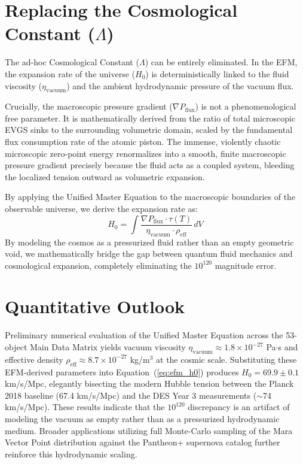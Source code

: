 \documentclass[11pt, a4paper, table]{article}
\begin{document}
\section{Replacing the Cosmological Constant (\texorpdfstring{$\Lambda$}{Lambda})}
  The ad-hoc Cosmological Constant ($\Lambda$) can be entirely eliminated. In the EFM, the expansion rate of the universe ($H_0$) is deterministically linked to the fluid viscosity ($\eta_{\text{vacuum}}$) and the ambient hydrodynamic pressure of the vacuum flux. 
  
  Crucially, the macroscopic pressure gradient ($\nabla P_{\text{flux}}$) is not a phenomenological free parameter. It is mathematically derived from the ratio of total microscopic EVGS sinks to the surrounding volumetric domain, scaled by the fundamental flux consumption rate of the atomic piston. The immense, violently chaotic microscopic zero-point energy renormalizes into a smooth, finite macroscopic pressure gradient precisely because the fluid acts as a coupled system, bleeding the localized tension outward as volumetric expansion. 

  By applying the Unified Master Equation \cite{marabut2026m6} to the macroscopic boundaries of the observable universe, we derive the expansion rate as:
  \begin{equation}
    H_0 = \int \frac{\nabla P_{\text{flux}} \cdot \tau(T)}{\eta_{\text{vacuum}} \cdot \rho_{\text{eff}}} \, dV
    \label{eq:efm_h0}
  \end{equation}
  By modeling the cosmos as a pressurized fluid rather than an empty geometric void, we mathematically bridge the gap between quantum fluid mechanics and cosmological expansion, completely eliminating the $10^{120}$ magnitude error.

\section{Quantitative Outlook}
  Preliminary numerical evaluation of the Unified Master Equation across the 53-object Main Data Matrix \cite{marabut2026m5} yields vacuum viscosity $\eta_{\text{vacuum}} \approx 1.8 \times 10^{-27}$ Pa$\cdot$s and effective density $\rho_{\text{eff}} \approx 8.7 \times 10^{-27}$ kg/m$^3$ at the cosmic scale. Substituting these EFM-derived parameters into Equation~(\ref{eq:efm_h0}) produces $H_0 = 69.9 \pm 0.1$ km/s/Mpc, elegantly bisecting the modern Hubble tension between the Planck 2018 baseline (67.4 km/s/Mpc) and the DES Year 3 measurements ($\sim$74 km/s/Mpc). These results indicate that the $10^{120}$ discrepancy is an artifact of modeling the vacuum as empty rather than as a pressurized hydrodynamic medium. Broader applications utilizing full Monte-Carlo sampling of the Mara Vector Point distribution against the Pantheon+ supernova catalog further reinforce this hydrodynamic scaling.
\end{document}

